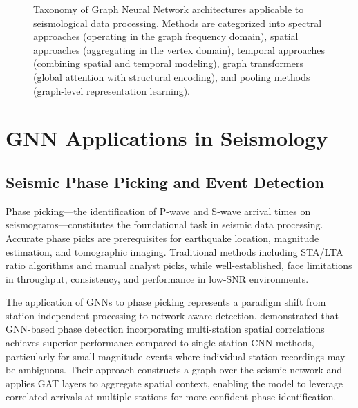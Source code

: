 \documentclass[review,authoryear]{elsarticle}
\begin{document}
\begin{figure}[htbp]
\caption{Taxonomy of Graph Neural Network architectures applicable to seismological data processing. Methods are categorized into spectral approaches (operating in the graph frequency domain), spatial approaches (aggregating in the vertex domain), temporal approaches (combining spatial and temporal modeling), graph transformers (global attention with structural encoding), and pooling methods (graph-level representation learning).}
\label{fig:gnn_taxonomy}
\end{figure}


\section{GNN Applications in Seismology}
\label{sec:applications}

\subsection{Seismic Phase Picking and Event Detection}

Phase picking---the identification of P-wave and S-wave arrival times on seismograms---constitutes the foundational task in seismic data processing. Accurate phase picks are prerequisites for earthquake location, magnitude estimation, and tomographic imaging. Traditional methods including STA/LTA ratio algorithms \citep{allen1978automatic, withers1998comparison} and manual analyst picks, while well-established, face limitations in throughput, consistency, and performance in low-SNR environments.

The application of GNNs to phase picking represents a paradigm shift from station-independent processing to network-aware detection. \citet{bilal2022graph} demonstrated that GNN-based phase detection incorporating multi-station spatial correlations achieves superior performance compared to single-station CNN methods, particularly for small-magnitude events where individual station recordings may be ambiguous. Their approach constructs a graph over the seismic network and applies GAT layers to aggregate spatial context, enabling the model to leverage correlated arrivals at multiple stations for more confident phase identification.
\end{document}
